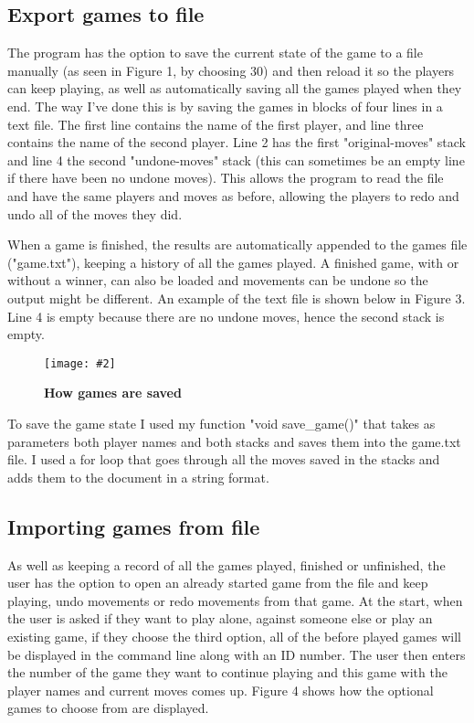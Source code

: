 \documentclass[10pt, a4paper]{article}
\newcommand{\figuremacro}[5]{
    \begin{figure}[#1]
        \centering
        \texttt{[image: \#2]}
        \caption[#3]{\textbf{#3}#4}
        \label{fig:#2}
    \end{figure}
}
\begin{document}
    \subsection{Export games to file}

The program has the option to save the current state of the game to a file manually (as seen in Figure 1, by choosing 30) and then reload it so the players can keep playing, as well as automatically saving all the games played when they end. The way I've done this is by saving the games in blocks of four lines in a text file. The first line contains the name of the first player, and line three contains the name of the second player. Line 2 has the first "original-moves" stack and line 4 the second "undone-moves" stack (this can sometimes be an empty line if there have been no undone moves). This allows the program to read the file and have the same players and moves as before, allowing the players to redo and undo all of the moves they did.

When a game is finished, the results are automatically appended to the games file ("game.txt"), keeping a history of all the games played. A finished game, with or without a winner, can also be loaded and movements can be undone so the output might be different. An example of the text file is shown below in Figure 3. Line 4 is empty because there are no undone moves, hence the second stack is empty.

\figuremacro{h}{game}{How games are saved}{}{0.8}

To save the game state I used my function "void save\_game()" that takes as parameters both player names and both stacks and saves them into the game.txt file. I used a for loop that goes through all the moves saved in the stacks and adds them to the document in a string format.

    \subsection{Importing games from file}

As well as keeping a record of all the games played, finished or unfinished, the user has the option to open an already started game from the file and keep playing, undo movements or redo movements from that game. At the start, when the user is asked if they want to play alone, against someone else or play an existing game, if they choose the third option, all of the before played games will be displayed in the command line along with an ID number. The user then enters the number of the game they want to continue playing and this game with the player names and current moves comes up. Figure 4 shows how the optional games to choose from are displayed.
\end{document}
